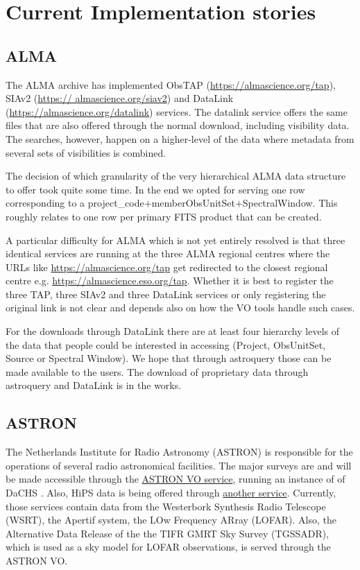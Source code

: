 \documentclass[11pt,a4paper]{ivoatex/ivoa}
\begin{document}
%



\appendix
\section{ Current Implementation stories}

\subsection{ALMA}
\label{sec:ALMA}
The ALMA archive has implemented ObsTAP (\url{https://almascience.org/tap}), SIAv2 (\url{https://
almascience.org/siav2}) and DataLink (\url{https://almascience.org/datalink}) services.
The datalink service offers the same files that are also offered through the normal download, including 
visibility data. The searches, however, happen on a higher-level of the data where metadata from several 
sets of visibilities is combined.

The decision of which granularity of the very hierarchical ALMA data
structure to offer took quite some time. In the end we opted for serving
one row corresponding to a project\_code$+$memberObsUnitSet$+$SpectralWindow. This roughly relates to 
one row per primary FITS product that can be created.

A particular difficulty for ALMA which is not yet entirely resolved is that three identical services are 
running at the three ALMA regional centres where the URLs like \url{https://almascience.org/tap} get 
redirected
to the closest regional centre e.g. \url{https://almascience.eso.org/tap}.
Whether it is best to register the three TAP, three SIAv2 and three DataLink services or only 
registering the original link is not clear and depends also on how the VO tools handle such cases.

For the downloads through DataLink there are at least four hierarchy
levels of the data that people could be interested in accessing (Project, ObsUnitSet, Source or Spectral
Window). We hope that through astroquery those can be made available to the users. The download of
proprietary data through astroquery and DataLink is in the works.

\subsection{ASTRON}\label{sec:Astron}
The Netherlands Institute for Radio Astronomy (ASTRON) is responsible for the operations of several radio astronomical facilities. The major surveys are and will be made accessible through the   {\href{https://vo.astron.nl/}{ASTRON VO service}}, running an instance of of DaCHS \citep{10.1016/j.ascom.2014.08.003}. Also, HiPS data is being offered through \href{https://hips.astron.nl/}{another service}. Currently, those services contain data from the Westerbork Synthesis Radio Telescope (WSRT), the Apertif system, the LOw Frequency ARray (LOFAR). Also, the Alternative Data Release of the the TIFR GMRT Sky Survey (TGSSADR), which is used as a sky model for LOFAR observations, is served through the ASTRON VO.
\end{document}
